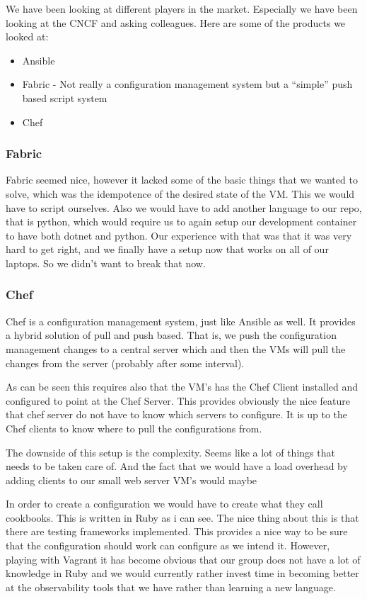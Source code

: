 We have been looking at different players in the market. Especially we have been looking at the CNCF and asking colleagues. Here are some of the products we looked at:

\begin{itemize}
    \item Ansible
    \item Fabric - Not really a configuration management system but a “simple” push based script system
    \item Chef
\end{itemize}

\subsubsection{Fabric}

Fabric seemed nice, however it lacked some of the basic things that we wanted to solve, which was the idempotence of the desired state of the VM. This we would have to script ourselves. Also we would have to add another language to our repo, that is python, which would require us to again setup our development container to have both dotnet and python. Our experience with that was that it was very hard to get right, and we finally have a setup now that works on all of our laptops. So we didn’t want to break that now.

\subsubsection{Chef}

Chef is a configuration management system, just like Ansible as well. It provides a hybrid solution of pull and push based. That is, we push the configuration management changes to a central server which and then the VMs will pull the changes from the server (probably after some interval).

As can be seen this requires also that the VM’s has the Chef Client installed and configured to point at the Chef Server. This provides obviously the nice feature that chef server do not have to know which servers to configure. It is up to the Chef clients to know where to pull the configurations from.

The downside of this setup is the complexity. Seems like a lot of things that needs to be taken care of. And the fact that we would have a load overhead by adding clients to our small web server VM’s would maybe

In order to create a configuration we would have to create what they call cookbooks. This is written in Ruby as i can see. The nice thing about this is that there are testing frameworks implemented. This provides a nice way to be sure that the configuration should work can configure as we intend it. However, playing with Vagrant it has become obvious that our group does not have a lot of knowledge in Ruby and we would currently rather invest time in becoming better at the observability tools that we have rather than learning a new language.

